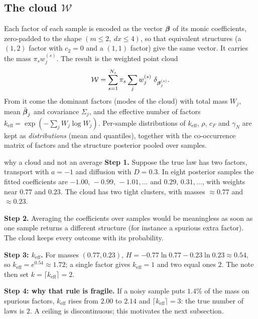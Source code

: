 \subsection{The cloud $\mathcal W$}
Each factor of each sample is encoded as the vector $\boldsymbol\beta$ of its monic coefficients, zero-padded to the shape $(m\le2,\ dx\le4)$, so that equivalent structures (a $(1,2)$ factor with $c_2=0$ and a $(1,1)$ factor) give the same vector. It carries the mass $\pi_sw^{(s)}_j$. The result is the weighted point cloud
\begin{equation}\label{eq:cloud}
\mathcal W=\sum_{s=1}^{N_s}\pi_s\sum_jw^{(s)}_j\ \delta_{\bs\beta^{(s)}_j}.
\end{equation}
From it come the dominant factors (modes of the cloud) with total mass $W_j$, mean $\bar{\boldsymbol\beta}_j$ and covariance $\Sigma_j$, and the effective number of factors $k_{\mathrm{eff}}=\exp(-\sum_jW_j\log W_j)$. Per-sample distributions of $k_{\mathrm{eff}}$, $\rho$, $c_F$ and $\gamma_N$ are kept as \emph{distributions} (mean and quantiles), together with the co-occurrence matrix of factors and the structure posterior pooled over samples.

\begin{explained}{why a cloud and not an average}
\textbf{Step 1.} Suppose the true law has two factors, transport with $a=-1$ and diffusion with $D=0.3$. In eight posterior samples the fitted coefficients are $-1.00,\,-0.99,\,-1.01,\dots$ and $0.29,\,0.31,\dots$, with weights near $0.77$ and $0.23$. The cloud has two tight clusters, with masses $\approx0.77$ and $\approx0.23$.

\medskip\textbf{Step 2.} Averaging the coefficients over samples would be meaningless as soon as one sample returns a different structure (for instance a spurious extra factor). The cloud keeps every outcome with its probability.

\medskip\textbf{Step 3: $k_{\mathrm{eff}}$.} For masses $(0.77,0.23)$, $H=-0.77\ln0.77-0.23\ln0.23\approx0.54$, so $k_{\mathrm{eff}}=e^{0.54}\approx1.72$; a single factor gives $k_{\mathrm{eff}}=1$ and two equal ones $2$. The note then set $k=\lceil k_{\mathrm{eff}}\rceil=2$.

\medskip\textbf{Step 4: why that rule is fragile.} If a noisy sample puts $1.4\%$ of the mass on spurious factors, $k_{\mathrm{eff}}$ rises from $2.00$ to $2.14$ and $\lceil k_{\mathrm{eff}}\rceil=3$: the true number of laws is $2$. A ceiling is discontinuous; this motivates the next subsection.
\end{explained}

